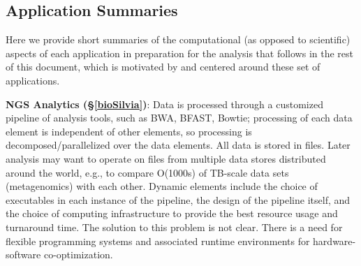 %



\subsection{Application Summaries}

Here we provide short summaries of the computational (as
opposed to scientific) aspects of each
application in preparation for the analysis that
follows in the rest of this document, which is motivated by and
centered around these set of applications.

{\bf NGS Analytics (\S\ref{bioSilvia})}: Data is processed through a
customized pipeline of analysis tools, such as BWA, BFAST, Bowtie;
processing of each data element is independent of other elements, so
processing is decomposed/parallelized over the data elements.  All
data is stored in files.  Later analysis may want to operate on files
from multiple data stores distributed around the world, e.g., to
compare O(1000s) of TB-scale data sets (metagenomics) with each other.
Dynamic elements include the choice of executables in each instance of
the pipeline, the design of the pipeline itself, and the choice of
computing infrastructure to provide the best resource usage and
turnaround time.  The solution to this problem is not clear.  There is
a need for flexible programming systems and associated runtime
environments for hardware-software co-optimization.

